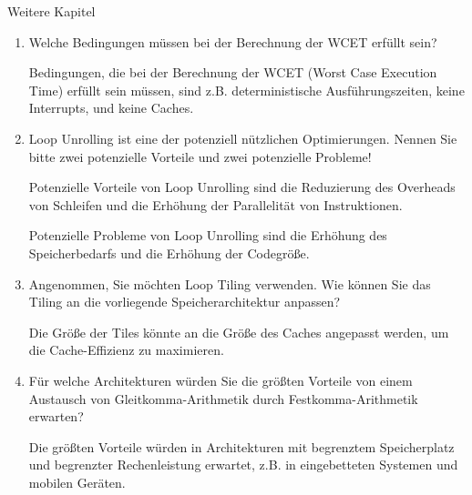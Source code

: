 \documentclass{article}
\begin{document}
\begin{exercise}{Weitere Kapitel}
  \begin{enumerate}
    \item Welche Bedingungen müssen bei der Berechnung der WCET erfüllt sein?

          \begin{solution}
            Bedingungen, die bei der Berechnung der WCET (Worst Case Execution Time) erfüllt sein müssen, sind z.B. deterministische Ausführungszeiten, keine Interrupts, und keine Caches.
          \end{solution}

    \item Loop Unrolling ist eine der potenziell nützlichen Optimierungen. Nennen Sie bitte zwei potenzielle Vorteile und zwei potenzielle Probleme!

          \begin{solution}
            Potenzielle Vorteile von Loop Unrolling sind die Reduzierung des Overheads von Schleifen und die Erhöhung der Parallelität von Instruktionen.

            Potenzielle Probleme von Loop Unrolling sind die Erhöhung des Speicherbedarfs und die Erhöhung der Codegröße.
          \end{solution}

    \item Angenommen, Sie möchten Loop Tiling verwenden. Wie können Sie das Tiling an die vorliegende Speicherarchitektur anpassen?

          \begin{solution}
            Die Größe der Tiles könnte an die Größe des Caches angepasst werden, um die Cache-Effizienz zu maximieren.
          \end{solution}

    \item Für welche Architekturen würden Sie die größten Vorteile von einem Austausch von Gleitkomma-Arithmetik durch Festkomma-Arithmetik erwarten?

          \begin{solution}
            Die größten Vorteile würden in Architekturen mit begrenztem Speicherplatz und begrenzter Rechenleistung erwartet, z.B. in eingebetteten Systemen und mobilen Geräten.
          \end{solution}
  \end{enumerate}
\end{exercise}
\end{document}
